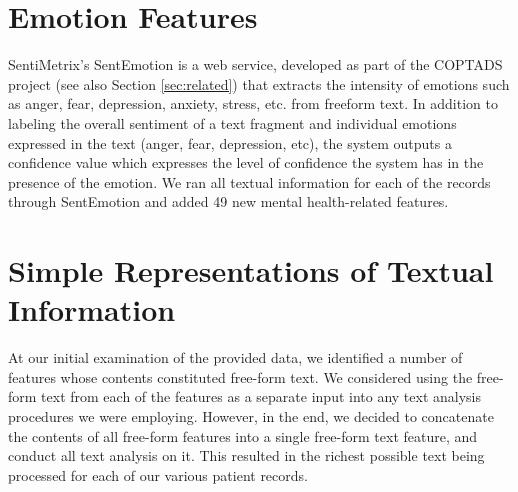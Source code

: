  \section{Emotion Features} SentiMetrix's SentEmotion is a web service,
 developed as part of the COPTADS project \cite{coptads-book,coptads} (see also Section \ref{sec:related}) that extracts the intensity of emotions such as anger, fear, depression, anxiety, stress, etc. from freeform text. In addition to labeling the overall sentiment of a text fragment
\cite{subrahmanian2008ava} and individual emotions expressed in the
 text (anger,  fear, depression, etc),  the system outputs a confidence value which expresses
 the level of confidence the system has in the presence of the emotion.
 We ran all textual information for each of the records through SentEmotion and
 added 49 new mental health-related features.
 
 
\section{Simple Representations of Textual Information}
 At our initial examination of the provided data, we identified a number of features
 whose contents constituted free-form text. We considered using the free-form text from each of the features as a separate input into any text analysis procedures we were employing.
 However, in the end, we decided to concatenate the contents of all free-form features into a single free-form text feature, and conduct all text analysis on it. This resulted in the richest possible text being processed for each of our various patient records. 
 
